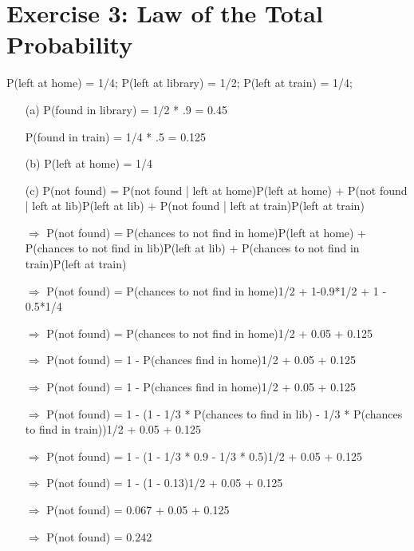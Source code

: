 \documentclass[unicode,11pt,a4paper,oneside,numbers=endperiod,openany]{scrartcl}
\begin{document}
\section*{Exercise 3: Law of the Total Probability}
      
    {P(left at home) = {1/4}}; 
    {P(left at library) = {1/2}}; 
    {P(left at train) = {1/4}}; 
\begin{enumerate}
	
	\item[(a)]
	P(found in library) = {1/2} * {.9} = {0.45}
	
	P(found in train) = {1/4} * {.5} = {0.125}
	\item[(b)] 
	P(left at home) = {1/4}
	\item[(c)]
    P(not found) = P(not found | left at home)P(left at home) + P(not found | left at lib)P(left at lib) + P(not found | left at train)P(left at train)
    
	$\Rightarrow$ P(not found) = P(chances to not find in home)P(left at home) + P(chances to not find in lib)P(left at lib) + P(chances to not find in train)P(left at train)
	
	$\Rightarrow$ P(not found) = P(chances to not find in home){1/2} + {1-0.9}*{1/2} + {1 - 0.5}*{1/4}
	
	$\Rightarrow$ P(not found) = P(chances to not find in home){1/2} + 0.05 + 0.125
	
	$\Rightarrow$ P(not found) = {1 - P(chances find in home)}{1/2} + 0.05 + 0.125
	
	$\Rightarrow$ P(not found) = {1 - P(chances find in home)}{1/2} + 0.05 + 0.125
	
    $\Rightarrow$ P(not found) = {1 - (1 - {{1/3} * P(chances to find in lib)} - {{1/3} * P(chances to find in train)})}{1/2} + 0.05 + 0.125
    
	$\Rightarrow$ P(not found) = {1 - (1 - {{1/3} * 0.9} - {{1/3} * 0.5})}{1/2} + 0.05 + 0.125
	
	$\Rightarrow$ P(not found) = {1 - (1 - 0.13)}{1/2} + 0.05 + 0.125
	
	$\Rightarrow$ P(not found) = 0.067 + 0.05 + 0.125
	
	$\Rightarrow$ P(not found) = 0.242

	
\end{enumerate}
\end{document}
